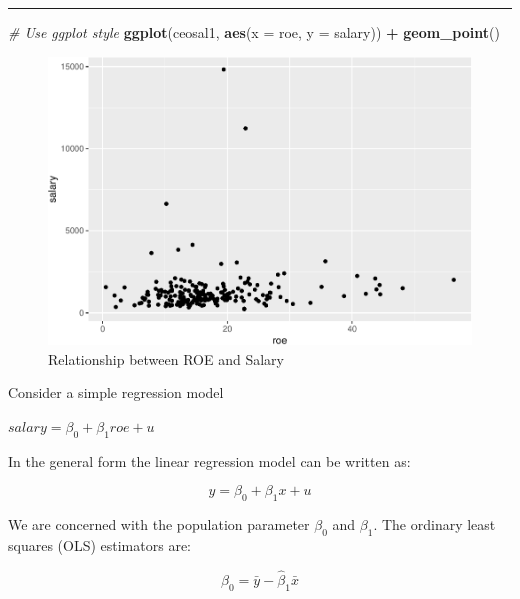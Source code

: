 \documentclass[]{book}
\newenvironment{Shaded}{\begin{snugshade}}{\end{snugshade}}
\newcommand{\CommentTok}[1]{\textcolor[rgb]{0.56,0.35,0.01}{\textit{#1}}}
\newcommand{\DataTypeTok}[1]{\textcolor[rgb]{0.13,0.29,0.53}{#1}}
\newcommand{\KeywordTok}[1]{\textcolor[rgb]{0.13,0.29,0.53}{\textbf{#1}}}
\newcommand{\NormalTok}[1]{#1}
\newcommand{\OperatorTok}[1]{\textcolor[rgb]{0.81,0.36,0.00}{\textbf{#1}}}
\newcommand{\StringTok}[1]{\textcolor[rgb]{0.31,0.60,0.02}{#1}}
\begin{document}
\begin{center}\rule{0.5\linewidth}{\linethickness}\end{center}

\begin{Shaded}
\begin{Highlighting}[]
\CommentTok{# Use ggplot style}
\KeywordTok{ggplot}\NormalTok{(ceosal1, }\KeywordTok{aes}\NormalTok{(}\DataTypeTok{x =}\NormalTok{ roe, }\DataTypeTok{y =}\NormalTok{ salary)) }\OperatorTok{+}
\StringTok{  }\KeywordTok{geom_point}\NormalTok{()}
\end{Highlighting}
\end{Shaded}

\begin{figure}
\centering
\includegraphics{MEM5220_R_files/figure-latex/ceosal1-1.pdf}
\caption{\label{fig:ceosal1}Relationship between ROE and Salary}
\end{figure}

Consider a simple regression model

\(salary = \beta_0 + \beta_1roe + u\)

In the general form the linear regression model can be written as:

\begin{equation}
y = \beta_{0} + \beta_{1}x + u
\label{eq:simplelinearregressionmodel}
\end{equation}

We are concerned with the population parameter \(\beta_{0}\) and
\(\beta_{1}\). The ordinary least squares (OLS) estimators are:

\begin{equation}
\hat{\beta}_{0} = \bar{y} - \hat{\beta}_{1}\bar{x}
\label{eq:populationparameterBeta0}
\end{equation}
\end{document}
